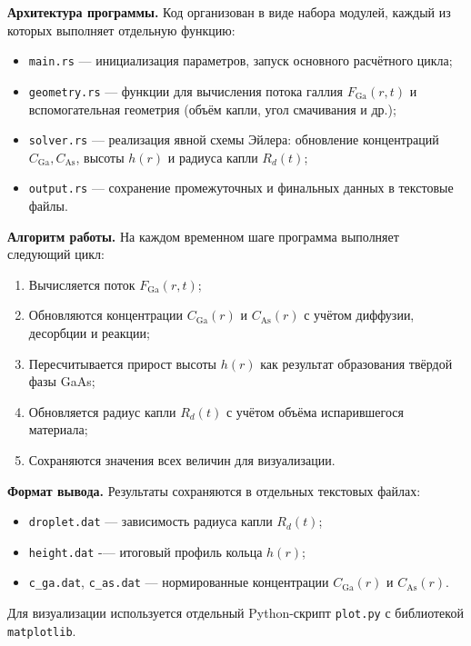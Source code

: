 \documentclass[14pt,oneside]{extarticle}
\begin{document}
\textbf{Архитектура программы.} Код организован в виде набора модулей, каждый из которых выполняет отдельную функцию:

\begin{itemize}
    \item \texttt{main.rs} — инициализация параметров, запуск основного расчётного цикла;
    \item \texttt{geometry.rs} — функции для вычисления потока галлия $F_{\mathrm{Ga}}(r, t)$ и вспомогательная геометрия (объём капли, угол смачивания и др.);
    \item \texttt{solver.rs} — реализация явной схемы Эйлера: обновление концентраций $C_{\mathrm{Ga}}, C_{\mathrm{As}}$, высоты $h(r)$ и радиуса капли $R_d(t)$;
    \item \texttt{output.rs} — сохранение промежуточных и финальных данных в текстовые файлы.
\end{itemize}

\textbf{Алгоритм работы.} На каждом временном шаге программа выполняет следующий цикл:

\begin{enumerate}
    \item Вычисляется поток $F_{\mathrm{Ga}}(r, t)$;
    \item Обновляются концентрации $C_{\mathrm{Ga}}(r)$ и $C_{\mathrm{As}}(r)$ с учётом диффузии, десорбции и реакции;
    \item Пересчитывается прирост высоты $h(r)$ как результат образования твёрдой фазы GaAs;
    \item Обновляется радиус капли $R_d(t)$ с учётом объёма испарившегося материала;
    \item Сохраняются значения всех величин для визуализации.
\end{enumerate}

\textbf{Формат вывода.} Результаты сохраняются в отдельных текстовых файлах:

\begin{itemize}
    \item \texttt{droplet.dat} — зависимость радиуса капли $R_d(t)$;
    \item \texttt{height.dat} -— итоговый профиль кольца $h(r)$;
    \item \texttt{c\_ga.dat}, \texttt{c\_as.dat} — нормированные концентрации $C_{\mathrm{Ga}}(r)$ и $C_{\mathrm{As}}(r)$.
\end{itemize}

Для визуализации используется отдельный Python-скрипт \texttt{plot.py} с библиотекой \texttt{matplotlib}.
\end{document}
